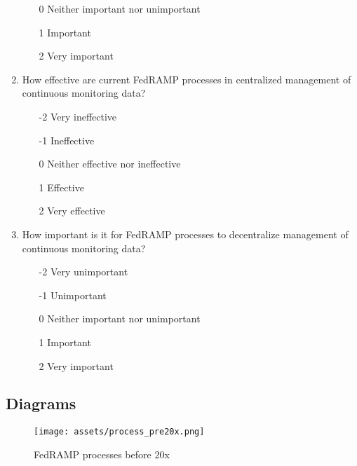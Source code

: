 \documentclass{jdf}
\begin{document}
\begin{enumerate}
\begin{enumerate}
        \item  [0] Neither important nor unimportant
        \item  [1] Important
        \item  [2] Very important
    \end{enumerate}
    \item How effective are current FedRAMP processes in centralized management of continuous monitoring data?
    \begin{enumerate}
        \item [-2] Very ineffective
        \item [-1] Ineffective
        \item  [0] Neither effective nor ineffective
        \item  [1] Effective 
        \item  [2] Very effective
    \end{enumerate}
    \item How important is it for FedRAMP processes to decentralize management of continuous monitoring data?
    \begin{enumerate}
        \item [-2] Very unimportant
        \item [-1] Unimportant
        \item  [0] Neither important nor unimportant
        \item  [1] Important
        \item  [2] Very important
    \end{enumerate}
\end{enumerate}

\subsection{Diagrams}

\begin{figure}[h!]
    \centering
    \texttt{[image: assets/process\_pre20x.png]}
    \caption{FedRAMP processes before 20x}
    \label{fig:conmon1}
\end{figure}
\end{document}
